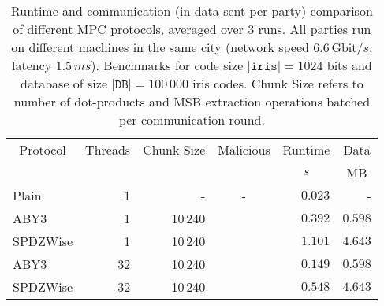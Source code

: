 \documentclass[a4paper,11pt,
]{article}
\newcommand{\cmark}{\ding{51}}%
\newcommand{\xmark}{\ding{55}}%
\begin{document}
\begin{table}[ht]
    \centering
    \caption{Runtime and communication (in data sent per party) comparison of different MPC protocols, averaged over 3 runs. All parties run on different machines in the same city (network speed $6.6\,\text{Gbit}/s$, latency $1.5\,ms$). Benchmarks for code size $|\texttt{iris}| = 1024$ bits and database of size $|\texttt{DB}| = 100\,000$ iris codes. Chunk Size refers to number of dot-products and MSB extraction operations batched per communication round.}
    \label{tab::bench_network_100k_iris_small}
    \begin{tabular}{lrrcrr}
        \toprule
        \multicolumn{1}{c}{Protocol} & \multicolumn{1}{c}{Threads} & \multicolumn{1}{c}{Chunk Size} & \multicolumn{1}{c}{Malicious} & \multicolumn{1}{c}{Runtime} & \multicolumn{1}{c}{Data} \\
                                     &                             &                                &                               & \multicolumn{1}{c}{$s$}     & \multicolumn{1}{c}{MB}   \\
        \midrule
        Plain                        & 1                           & -                              & -                             & $0.023$                     & -                        \\
        ABY3                         & 1                           & 10\,240                        & \xmark                        & $0.392$                     & $0.598$                  \\
        SPDZWise                     & 1                           & 10\,240                        & \cmark                        & $1.101$                     & $4.643$                  \\
        \midrule
        ABY3                         & 32                          & 10\,240                        & \xmark                        & $0.149$                     & $0.598$                  \\
        SPDZWise                     & 32                          & 10\,240                        & \cmark                        & $0.548$                     & $4.643$                  \\
        \bottomrule
    \end{tabular}
\end{table}
\end{document}
